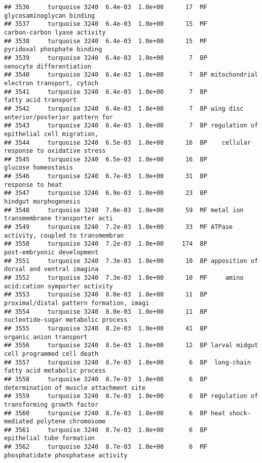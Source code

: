 \documentclass[]{article}
\begin{document}
\begin{verbatim}
## 3536     turquoise 3240  6.4e-03  1.0e+00      17  MF                glycosaminoglycan binding
## 3537     turquoise 3240  6.4e-03  1.0e+00      15  MF             carbon-carbon lyase activity
## 3538     turquoise 3240  6.4e-03  1.0e+00      15  MF              pyridoxal phosphate binding
## 3539     turquoise 3240  6.4e-03  1.0e+00       7  BP                 oenocyte differentiation
## 3540     turquoise 3240  6.4e-03  1.0e+00       7  BP mitochondrial electron transport, cytoch
## 3541     turquoise 3240  6.4e-03  1.0e+00       7  BP                     fatty acid transport
## 3542     turquoise 3240  6.4e-03  1.0e+00       7  BP wing disc anterior/posterior pattern for
## 3543     turquoise 3240  6.4e-03  1.0e+00       7  BP regulation of epithelial cell migration,
## 3544     turquoise 3240  6.5e-03  1.0e+00      16  BP    cellular response to oxidative stress
## 3545     turquoise 3240  6.5e-03  1.0e+00      16  BP                      glucose homeostasis
## 3546     turquoise 3240  6.7e-03  1.0e+00      31  BP                         response to heat
## 3547     turquoise 3240  6.9e-03  1.0e+00      23  BP                    hindgut morphogenesis
## 3548     turquoise 3240  7.0e-03  1.0e+00      59  MF metal ion transmembrane transporter acti
## 3549     turquoise 3240  7.2e-03  1.0e+00      33  MF ATPase activity, coupled to transmembran
## 3550     turquoise 3240  7.2e-03  1.0e+00     174  BP               post-embryonic development
## 3551     turquoise 3240  7.3e-03  1.0e+00      10  BP apposition of dorsal and ventral imagina
## 3552     turquoise 3240  7.3e-03  1.0e+00      10  MF     amino acid:cation symporter activity
## 3553     turquoise 3240  8.0e-03  1.0e+00      11  BP proximal/distal pattern formation, imagi
## 3554     turquoise 3240  8.0e-03  1.0e+00      11  BP       nucleotide-sugar metabolic process
## 3555     turquoise 3240  8.2e-03  1.0e+00      41  BP                  organic anion transport
## 3556     turquoise 3240  8.5e-03  1.0e+00      12  BP larval midgut cell programmed cell death
## 3557     turquoise 3240  8.7e-03  1.0e+00       6  BP  long-chain fatty acid metabolic process
## 3558     turquoise 3240  8.7e-03  1.0e+00       6  BP  determination of muscle attachment site
## 3559     turquoise 3240  8.7e-03  1.0e+00       6  BP regulation of transforming growth factor
## 3560     turquoise 3240  8.7e-03  1.0e+00       6  BP heat shock-mediated polytene chromosome 
## 3561     turquoise 3240  8.7e-03  1.0e+00       6  BP                epithelial tube formation
## 3562     turquoise 3240  8.7e-03  1.0e+00       6  MF       phosphatidate phosphatase activity

\end{verbatim}
\end{document}
